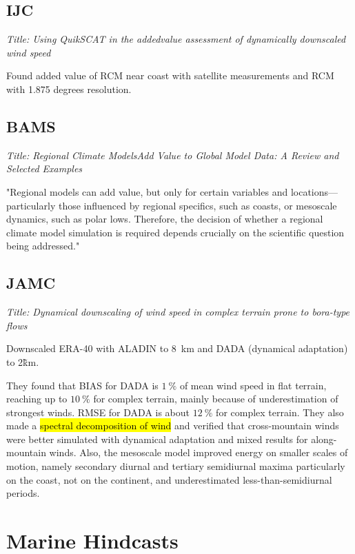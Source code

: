 \documentclass[12pt,a4paper]{article}
\begin{document}
\subsection{\cite{Winterfeldt2011} IJC }

\textit{Title: Using QuikSCAT in the addedvalue assessment of dynamically downscaled wind speed}

Found added value of RCM near coast with satellite measurements and RCM with 1.875 degrees resolution. 

\subsection{\cite{Feser2011RegionalExamples} BAMS}

\textit{Title: Regional Climate ModelsAdd Value to Global Model Data: A Review and Selected Examples}

"Regional models can add value, but only for certain variables and locations—particularly those influenced by regional specifics, such as coasts, or mesoscale dynamics, such as polar lows. Therefore, the decision of whether a regional climate model simulation is required depends crucially on the scientific question being addressed."

\subsection{\cite{Horvath2011} JAMC}

\textit{Title: Dynamical downscaling of wind speed in complex terrain prone to bora-type flows}

Downscaled ERA-40 with ALADIN to 8~km and DADA (dynamical adaptation) to 2\~km. 

They found that BIAS for DADA is $1~\%$ of mean wind speed in flat terrain, reaching up to $10~\%$ for complex terrain, mainly because of underestimation of strongest winds. RMSE for DADA is about $12~\%$ for complex terrain. They also made a \hl{spectral decomposition of wind} and verified that cross-mountain winds were better simulated with dynamical adaptation and mixed results for along-mountain winds. Also, the mesoscale model improved energy on smaller scales of motion, namely secondary diurnal and tertiary semidiurnal maxima particularly on the coast, not on the continent, and underestimated less-than-semidiurnal periods.


\section{Marine Hindcasts}
\end{document}
